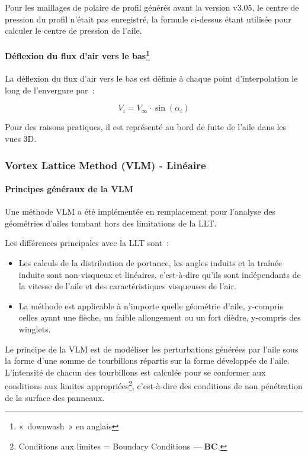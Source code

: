 \documentclass[a4paper,twoside,12pt,dvips]{article}
\begin{document}
Pour les maillages de polaire de profil générés avant la version v3.05, le 
centre de pression du profil n’était pas enregistré, la formule ci-dessus
étant utilisée pour calculer le centre de pression de l’aile.

\paragraph{Déflexion du flux d’air vers le bas\protect\footnote{«~downwash~» en anglais}}

La déflexion du flux d’air vers le bas est définie à chaque point d’interpolation le long de l’envergure par~:

$$ V_i = V_\infty \cdot \sin \left(\alpha_i \right) $$

Pour des raisons pratiques, il est représenté au bord de fuite de l’aile 
dans les vues 3D. 

\subsubsection{Vortex Lattice Method (VLM) - Linéaire}

\paragraph{Principes généraux de la VLM}
Une méthode VLM a été implémentée en remplacement pour l’analyse des 
géométries d’ailes tombant hors des limitations de la LLT.

Les différences principales avec la LLT sont~:
\begin{itemize}
	\item Les calculs de la distribution de portance, les angles induits et la
	traînée induite sont non-visqueux et linéaires, c’est-à-dire qu’ils sont 
	indépendants de la vitesse de l’aile et des caractéristiques visqueuses de 
	l’air. 
	\item La méthode est applicable à n’importe quelle géométrie d’aile, 
	y-compris celles ayant une flèche, un faible allongement ou un fort dièdre,
	y-compris des winglets. 
\end{itemize}

Le principe de la VLM est de modéliser les perturbations générées par 
l’aile sous la forme d’une somme de tourbillons répartis sur la forme développée de l’aile. L’intensité de chacun des tourbillons est calculée pour se
conformer aux conditions aux limites appropriées\footnote{Conditions aux
limites = Boundary Conditions — \textbf{BC}.}, c’est-à-dire des conditions
de non pénétration de la surface des panneaux. 
\end{document}
